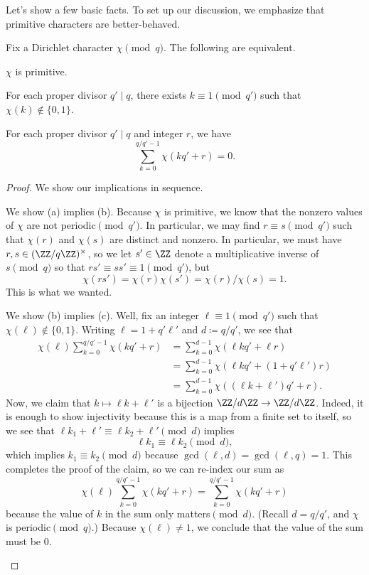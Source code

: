 \documentclass[../notes.tex]{subfiles}
\begin{document}
Let's show a few basic facts. To set up our discussion, we emphasize that primitive characters are better-behaved.
\begin{lemma} \label{lem:primitive-facts}
	Fix a Dirichlet character $\chi\pmod q$. The following are equivalent.
	\begin{listalph}
		\item $\chi$ is primitive.
		\item For each proper divisor $q'\mid q$, there exists $k\equiv1\pmod{q'}$ such that $\chi(k)\notin\{0,1\}$.
		\item For each proper divisor $q'\mid q$ and integer $r$, we have
		\[\sum_{k=0}^{q/q'-1}\chi(kq'+r)=0.\]
	\end{listalph}
\end{lemma}
\begin{proof}
	We show our implications in sequence.
	\begin{listalph}
		\item We show (a) implies (b). Because $\chi$ is primitive, we know that the nonzero values of $\chi$ are not periodic$\pmod{q'}$. In particular, we may find $r\equiv s\pmod{q'}$ such that $\chi(r)$ and $\chi(s)$ are distinct and nonzero. In particular, we must have $r,s\in(\ZZ/q\ZZ)^\times$, so we let $s'\in\ZZ$ denote a multiplicative inverse of $s\pmod q$ so that $rs'\equiv ss'\equiv1\pmod{q'}$, but
		\[\chi(rs')=\chi(r)\chi(s')=\chi(r)/\chi(s)=1.\]
		This is what we wanted.
		\item We show (b) implies (c). Well, fix an integer $\ell\equiv1\pmod{q'}$ such that $\chi(\ell)\notin\{0,1\}$. Writing $\ell=1+q'\ell'$ and $d\coloneqq q/q'$, we see that
		\begin{align*}
			\chi(\ell)\sum_{k=0}^{q/q'-1}\chi(kq'+r) &= \sum_{k=0}^{d-1}\chi(\ell kq'+\ell r) \\
			&= \sum_{k=0}^{d-1}\chi(\ell kq'+(1+q'\ell')r) \\
			&= \sum_{k=0}^{d-1}\chi((\ell k+\ell')q'+r).
		\end{align*}
		Now, we claim that $k\mapsto\ell k+\ell'$ is a bijection $\ZZ/d\ZZ\to\ZZ/d\ZZ$. Indeed, it is enough to show injectivity because this is a map from a finite set to itself, so we see that $\ell k_1+\ell'\equiv\ell k_2+\ell'\pmod d$ implies
		\[\ell k_1\equiv\ell k_2\pmod d,\]
		which implies $k_1\equiv k_2\pmod d$ because $\gcd(\ell,d)=\gcd(\ell,q)=1$. This completes the proof of the claim, so we can re-index our sum as
		\[\chi(\ell)\sum_{k=0}^{q/q'-1}\chi(kq'+r)=\sum_{k=0}^{q/q'-1}\chi(kq'+r)\]
		because the value of $k$ in the sum only matters$\pmod d$. (Recall $d=q/q'$, and $\chi$ is periodic$\pmod q$.) Because $\chi(\ell)\ne1$, we conclude that the value of the sum must be $0$.

\end{listalph}
\end{proof}
\end{document}
